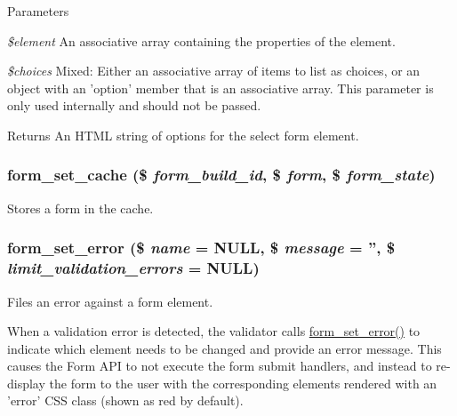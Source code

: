 \begin{DoxyParams}{Parameters}
\item[{\em \$element}]An associative array containing the properties of the element. \item[{\em \$choices}]Mixed: Either an associative array of items to list as choices, or an object with an 'option' member that is an associative array. This parameter is only used internally and should not be passed.\end{DoxyParams}
\begin{DoxyReturn}{Returns}
An HTML string of options for the select form element. 
\end{DoxyReturn}
\hypertarget{group__form__api_ga274fe9a7fe000a43b7f173e3b54dae7f}{
\subsubsection[{form\_\-set\_\-cache}]{\setlength{\rightskip}{0pt plus 5cm}form\_\-set\_\-cache (\$ {\em form\_\-build\_\-id}, \/  \$ {\em form}, \/  \$ {\em form\_\-state})}}
\label{group__form__api_ga274fe9a7fe000a43b7f173e3b54dae7f}
Stores a form in the cache. \hypertarget{group__form__api_ga6f4ecbec42e905390e521b393417f97f}{
\subsubsection[{form\_\-set\_\-error}]{\setlength{\rightskip}{0pt plus 5cm}form\_\-set\_\-error (\$ {\em name} = {\ttfamily NULL}, \/  \$ {\em message} = {\ttfamily ''}, \/  \$ {\em limit\_\-validation\_\-errors} = {\ttfamily NULL})}}
\label{group__form__api_ga6f4ecbec42e905390e521b393417f97f}
Files an error against a form element.

When a validation error is detected, the validator calls \hyperlink{group__form__api_ga6f4ecbec42e905390e521b393417f97f}{form\_\-set\_\-error()} to indicate which element needs to be changed and provide an error message. This causes the Form API to not execute the form submit handlers, and instead to re-\/display the form to the user with the corresponding elements rendered with an 'error' CSS class (shown as red by default).


